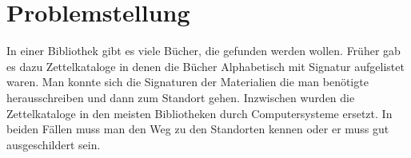 
\chapter{Problemstellung}\label{Problemstellung}

\medskip
In einer Bibliothek gibt es viele Bücher, die gefunden werden wollen. Früher gab es dazu Zettelkataloge in denen die Bücher Alphabetisch mit Signatur aufgelistet waren. Man konnte sich die Signaturen der Materialien die man benötigte herausschreiben und dann zum Standort gehen. Inzwischen wurden die Zettelkataloge in den meisten Bibliotheken durch Computersysteme ersetzt. In beiden Fällen muss man den Weg zu den Standorten kennen oder er muss gut ausgeschildert sein.